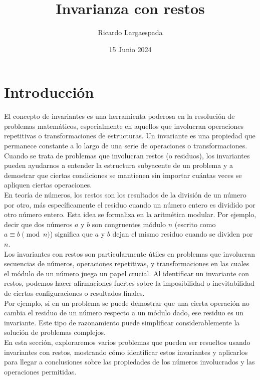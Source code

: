 \documentclass[11pt]{scrartcl}
\begin{document}
\title{Invarianza con restos}
\author{Ricardo Largaespada}
\date{15 Junio 2024}

\maketitle
\section{Introducción}

El concepto de invariantes es una herramienta poderosa en la resolución de problemas matemáticos, especialmente en aquellos que involucran operaciones repetitivas o transformaciones de estructuras. Un invariante es una propiedad que permanece constante a lo largo de una serie de operaciones o transformaciones. Cuando se trata de problemas que involucran restos (o residuos), los invariantes pueden ayudarnos a entender la estructura subyacente de un problema y a demostrar que ciertas condiciones se mantienen sin importar cuántas veces se apliquen ciertas operaciones.\\

En teoría de números, los restos son los resultados de la división de un número por otro, más específicamente el residuo cuando un número entero es dividido por otro número entero. Esta idea se formaliza en la aritmética modular. Por ejemplo, decir que dos números \( a \) y \( b \) son congruentes módulo \( n \) (escrito como \( a \equiv b \pmod{n} \)) significa que \( a \) y \( b \) dejan el mismo residuo cuando se dividen por \( n \).\\

Los invariantes con restos son particularmente útiles en problemas que involucran secuencias de números, operaciones repetitivas, y transformaciones en las cuales el módulo de un número juega un papel crucial. Al identificar un invariante con restos, podemos hacer afirmaciones fuertes sobre la imposibilidad o inevitabilidad de ciertas configuraciones o resultados finales.\\

Por ejemplo, si en un problema se puede demostrar que una cierta operación no cambia el residuo de un número respecto a un módulo dado, ese residuo es un invariante. Este tipo de razonamiento puede simplificar considerablemente la solución de problemas complejos.\\

En esta sección, exploraremos varios problemas que pueden ser resueltos usando invariantes con restos, mostrando cómo identificar estos invariantes y aplicarlos para llegar a conclusiones sobre las propiedades de los números involucrados y las operaciones permitidas.
\end{document}

